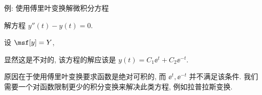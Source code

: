 \begin{frame}{例: 使用傅里叶变换解微积分方程\noexer}
	\onslide<+->
	\begin{example}
		解方程 $y''(t)-y(t)=0$.
	\end{example}

	\onslide<+->
	\begin{solution}
			设 $\msf[y]=Y$,
		\onslide<+->{则
			\[\msf[y''(t)-y(t)]=[(j\omega)^2-1]Y(\omega)=0,
	\]
		}
		\vspace{-\baselineskip}
		\onslide<+->{\[Y(\omega)=0,\quad y(t)=\msf^{-1}[Y(\omega)]=0.\]}
		\vspace{-\baselineskip}
	\end{solution}

	\onslide<+->
	显然这是不对的, 该方程的解应该是 $y(t)=C_1\ee^t+C_2\ee^{-t}$.

	\onslide<+->
	原因在于使用傅里叶变换要求函数是绝对可积的, 而 $\ee^t,\ee^{-t}$ 并不满足该条件.
	\onslide<+->
	我们需要一个对函数限制更少的积分变换来解决此类方程, 例如拉普拉斯变换.
\end{frame}

